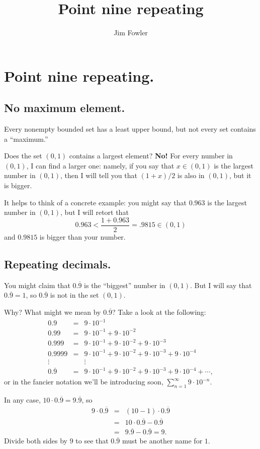 \documentclass[11pt,letterpaper]{article}
\title{Point nine repeating}
\author{Jim Fowler}
\begin{document}
\section*{Point nine repeating.}

\subsection*{No maximum element.}

Every nonempty bounded set has a least upper bound, but not every set
contains a ``maximum.''

Does the set $(0,1)$ contains a largest element?  \textbf{No!}  For
every number in $(0,1)$, I can find a larger one: namely, if you say
that $x \in (0,1)$ is the largest number in $(0,1)$, then I will tell
you that $(1 + x)/2$ is also in $(0,1)$, but it is bigger.

It helps to think of a concrete example: you might say that $0.963$ is
the largest number in $(0,1)$, but I will retort that
$$
0.963 < \frac{1 + 0.963}{2} = .9815 \in (0,1)
$$
and $0.9815$ is bigger than your number.

\subsection*{Repeating decimals.}

You might claim that $0.\overline{9}$ is the ``biggest'' number in
$(0,1)$.  But I will say that $0.\overline{9} = 1$, so $0.\overline{9}$
is not in the set $(0,1)$.

Why?  What might we mean by $0.\overline{9}$?  Take a look at the following:
\begin{eqnarray*}
0.9 &=& 9 \cdot 10^{-1} \\
0.99 &=& 9 \cdot 10^{-1} + 9 \cdot 10^{-2} \\
0.999 &=& 9 \cdot 10^{-1} + 9 \cdot 10^{-2} + 9 \cdot 10^{-3} \\
0.9999 &=& 9 \cdot 10^{-1} + 9 \cdot 10^{-2} + 9 \cdot 10^{-3} + 9 \cdot 10^{-4} \\
\vdots & & \vdots \\
0.\overline{9} &=& 9 \cdot 10^{-1} + 9 \cdot 10^{-2} + 9 \cdot 10^{-3} + 9 \cdot 10^{-4} + \cdots,
\end{eqnarray*}
or in the fancier notation we'll be introducing soon, $\displaystyle\sum_{n=1}^\infty 9 \cdot 10^{-n}$.

In any case, $10 \cdot 0.\overline{9} = 9.\overline{9}$, so
\begin{eqnarray*}
9 \cdot 0.\overline{9} &=& (10 - 1) \cdot 0.\overline{9} \\
&=& 10 \cdot 0.\overline{9} - 0.\overline{9} \\
&=& 9.\overline{9} - 0.\overline{9} = 9.
\end{eqnarray*}
Divide both sides by $9$ to see that $0.\overline{9}$ must be another
name for $1$.
\end{document}
